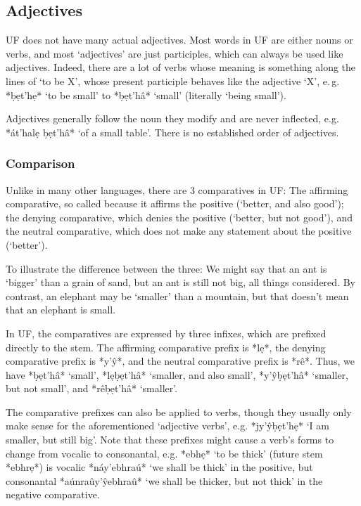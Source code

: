 \documentclass[a4paper, 12pt, oneside, final]{article}
\begin{document}
\subsection{Adjectives}
UF does not have many actual adjectives. Most words in UF are either nouns or verbs, and most ‘adjectives’ are just
participles, which can always be used like adjectives. Indeed, there are a lot of verbs whose meaning is something
along the lines of ‘to be X’, whose present participle behaves like the adjective ‘X’, e.\,g. *ḅẹt’hẹ* ‘to be small’
to *ḅẹt’hâ* ‘small’ (literally ‘being small’).

Adjectives generally follow the noun they modify and are never inflected, e.g. *át’halẹ ḅẹt’hâ* ‘of a small table’.
There is no established order of adjectives.

\subsubsection{Comparison}
Unlike in many other languages, there are 3 comparatives in UF: The affirming comparative, so called
because it affirms the positive (‘better, and also good’); the denying comparative, which denies the positive
(‘better, but not good’), and the neutral comparative, which does not make any statement about the positive
(‘better’).

To illustrate the difference between the three: We might say that an ant is ‘bigger’ than a grain of sand, but
an ant is still not big, all things considered. By contrast, an elephant may be ‘smaller’ than a mountain,
but that doesn’t mean that an elephant is small.

In UF, the comparatives are expressed by three infixes, which are prefixed directly to the stem. The affirming
comparative prefix is *lẹ*, the denying comparative prefix is *y’ŷ*, and the neutral comparative prefix is *rê*.
Thus, we have *ḅẹt’hâ* ‘small’, *lẹḅẹt’hâ* ‘smaller, and also small’, *y’ŷḅẹt’hâ* ‘smaller, but not small’, and
*rêḅẹt’hâ* ‘smaller’.

The comparative prefixes can also be applied to verbs, though they usually only make sense for the aforementioned
‘adjective verbs’, e.g. *jy’ŷḅẹt’hẹ* ‘I am smaller, but still big’. Note that these prefixes
might cause a verb’s forms to change from vocalic to consonantal, e.g. *ebhẹ* ‘to be thick’ (future stem *ebhrẹ*)
is vocalic *náy’ebhraú* ‘we shall be thick’ in the positive, but consonantal *aúnraûy’ŷebhraû* ‘we shall be
thicker, but not thick’ in the negative comparative.
\end{document}
